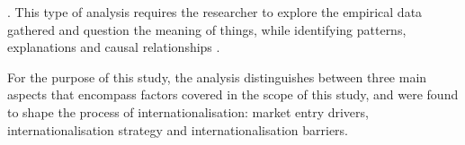 \documentclass[11pt,a4paper]{article}
\begin{document}
{{. This type of analysis requires the researcher to explore the empirical data gathered and question the meaning of things, while identifying patterns, explanations and causal relationships \parencite{cruzesCaseStudiesSynthesis2015, yinCaseStudyResearch2017}. \par
For the purpose of this study, the analysis distinguishes between three main aspects that encompass factors covered in the scope of this study, and were found to shape the process of internationalisation: market entry drivers, internationalisation strategy and internationalisation barriers. 


\vspace{-2mm}
}}
\end{document}
